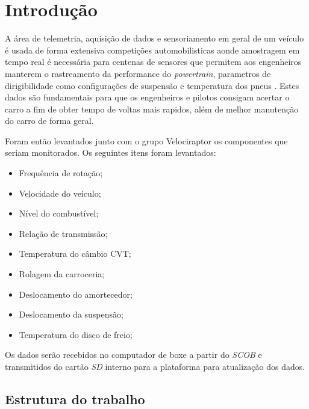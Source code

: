 \chapter{Introdução} 
	\label{ch:introducao}

A área de telemetria, aquisição de dados e sensoriamento em geral de um veículo é usada de forma extensiva competições automobilisticas aonde amostragem em tempo real é necessária para centenas de sensores que permitem aos engenheiros manterem o rastreamento da performance do \textit{powertrain}, parametros de dirigibilidade como configurações de suspensão e temperatura dos pneus \cite{designAndImplementation2015}. Estes dados são fundamentais para que os engenheiros e pilotos consigam acertar o carro a fim de obter tempo de voltas mais rapidos, além de melhor manutenção do carro de forma geral.


Foram então levantados junto com o grupo Velociraptor os componentes que seriam monitorados. Os seguintes itens foram levantados: 
\begin{itemize}
	\item Frequência de rotação;
	\item Velocidade do veículo;
	\item Nível do combustível;
	\item Relação de transmissão;
	\item Temperatura do câmbio CVT;
	\item Rolagem da carroceria;
	\item Deslocamento do amortecedor;
	\item Deslocamento da suspensão;
	\item Temperatura do disco de freio;
\end{itemize}
\newpage

Os dados serão recebidos no computador de boxe a partir do \textit{SCOB} e transmitidos do cartão \textit{SD} interno para a plataforma para atualização dos dados.  

\section{Estrutura do trabalho}
